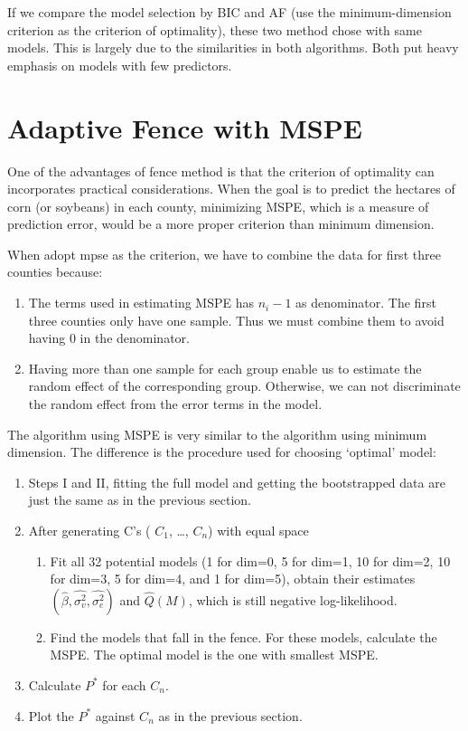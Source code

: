 \documentclass[11pt,letter]{article}
\begin{document}
If we compare the model selection by BIC and AF (use the minimum-dimension criterion as the criterion of optimality), these two method chose with same models.  This is largely due to the similarities in both algorithms.  Both put heavy emphasis on models with few predictors.

\section{Adaptive Fence with MSPE }
One of the advantages of fence method is that the criterion of optimality can incorporates practical considerations. When the goal is to predict the hectares of corn (or soybeans) in each county, minimizing MSPE, which is a measure of prediction error, would be a more proper criterion than minimum dimension.

 When adopt mpse as the criterion, we have to combine the data for first three counties because:
\begin{enumerate}
  \item The terms used in estimating MSPE has $n_i-1$ as denominator. The first three counties only have one sample.  Thus we must combine them to avoid having 0 in the denominator.
  \item Having more than one sample for each group enable us to estimate the random effect of the corresponding group. Otherwise, we can not discriminate the random effect from the error terms in the model.
\end{enumerate}

The algorithm using MSPE is very similar to the algorithm using minimum dimension.  The difference is the procedure used for choosing ‘optimal’ model:
\begin{enumerate}
\item Steps I and II, fitting the full model and getting the bootstrapped data are just the same as in the previous section.
\item After generating C’s ( $C_1$, \ldots , $C_n$) with equal space
\begin{enumerate}
\item Fit all 32 potential models (1 for dim=0, 5 for dim=1, 10 for dim=2, 10 for dim=3, 5 for dim=4, and 1 for dim=5), obtain their estimates $(\hat{\beta},\hat{\sigma_{v}^{2}}, \hat{\sigma_{e}^{2}} )$ and $\hat{Q}(M) $, which is still negative log-likelihood.
\item Find the models that fall in the fence. For these models, calculate the MSPE.  The optimal model is the one with smallest MSPE.
\end{enumerate}
\item Calculate $P^{*}$ for each $ C_{n}$.
\item Plot the $ P^{*}$ against $C_{n}$ as in the previous section.
\end{enumerate}
\end{document}
